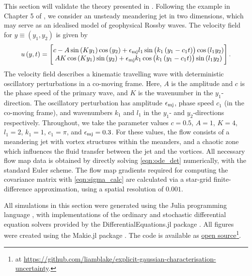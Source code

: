 This section will validate the theory presented in .
Following the example in Chapter 5 of \cite{SamelsonWiggins_2006_LagrangianTransportGeophysical}, we consider an unsteady meandering jet in two dimensions, which may serve as an idealised model of geophysical Rossby waves.
The velocity field for \(y \equiv \left(y_1, y_2\right)\) is given by \cite{SamelsonWiggins_2006_LagrangianTransportGeophysical}
\begin{equation}
	u\left(y, t\right) = \begin{bmatrix}
		c - A\sin\left(Ky_1\right)\cos\left(y_2\right) + \epsilon_{\mathrm{mj}} l_1\sin\left(k_1\left(y_1 - c_1 t\right)\right)\cos\left(l_1 y_2\right) \\
		AK\cos\left(Ky_1\right)\sin\left(y_2\right) + \epsilon_{\mathrm{mj}} k_1\cos\left(k_1\left(y_1 - c_1t\right)\right)\sin\left(l_1 y_2\right)
	\end{bmatrix}.
 \label{eqn:jet_ex}
\end{equation}
The velocity field describes a kinematic travelling wave with deterministic oscillatory perturbations in a co-moving frame.
Here, \(A\) is the amplitude and \(c\) is the phase speed of the primary wave, and \(K\) is the wavenumber in the \(y_1\)-direction.
The oscillatory perturbation has amplitude \(\epsilon_{\mathrm{mj}}\), phase speed \(c_1\) (in the co-moving frame), and wavenumbers \(k_1\) and \(l_1\) in the \(y_1\)- and \(y_2\)-directions respectively.
Throughout, we take the parameter values \(c = 0.5\), \(A = 1\), \(K = 4\), \(l_1 = 2\), \(k_1 = 1\), \(c_1 = \pi\), and \(\epsilon_{\mathrm{mj}} = 0.3\).
For these values, the flow consists of a meandering jet with vortex structures within the meanders, and a chaotic zone
which influences the fluid transfer between the jet and the vortices. 
All necessary flow map data is obtained by directly solving \eqref{eqn:ode_det} numerically, with the standard Euler scheme.
The flow map gradients required for computing the covariance matrix with \eqref{eqn:sigma_calc} are calculated via a star-grid finite-difference approximation, using a spatial resolution of \(0.001\). 

All simulations in this section were generated using the Julia programming language \cite{BezansonEtAl_2017_JuliaFreshApproach}, with implementations of the ordinary and stochastic differential equation solvers provided by the DifferentialEquations.jl package \cite{RackauckasNie_2017_DifferentialEquationsJlPerformant}.
All figures were created using the Makie.jl package \cite{DanischKrumbiegel_2021_MakieJlFlexible}.
The code is available as  \href{https://github.com/liamblake/explicit-gaussian-characterisation-uncertainty}{open source}\footnote{at \url{https://github.com/liamblake/explicit-gaussian-characterisation-uncertainty}.}.


